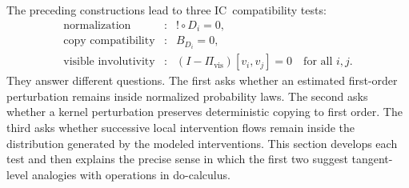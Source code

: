 \documentclass{article}
\theoremstyle{plain}
\theoremstyle{definition}
\theoremstyle{remark}
\newcommand{\Pvis}{\Pi_{\mathrm{vis}}}
\newcommand{\IC}{\textsc{IC}}
\begin{document}
The preceding constructions lead to three \IC\ compatibility tests:
\[
\begin{array}{rcll}
\text{normalization}      &:& !\circ D_i=0,\\[1mm]
\text{copy compatibility}&:& B_{D_i}=0,\\[1mm]
\text{visible involutivity}&:&
  (I-\Pvis)[v_i,v_j]=0\quad\text{for all }i,j.
\end{array}
\]
They answer different questions.  The first asks whether an estimated
first-order perturbation remains inside normalized probability laws.  The
second asks whether a kernel perturbation preserves deterministic copying to
first order.  The third asks whether successive local intervention flows remain
inside the distribution generated by the modeled interventions.  This section
develops each test and then explains the precise sense in which the first two
suggest tangent-level analogies with operations in do-calculus.
\end{document}

